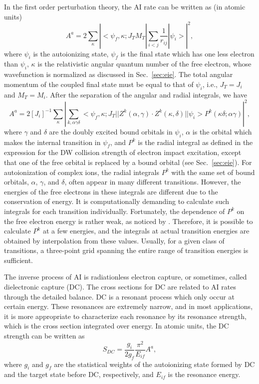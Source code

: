In the first order perturbation theory, the AI rate can be written as (in
atomic units) 
\begin{equation}
A^a = 2\sum_\kappa \left|
<\psi_f,\kappa;J_TM_T|\sum_{i<j}\frac{1}{r_{ij}}|\psi_i>\right|^2,
\end{equation}
where $\psi_i$ is the autoionizing state, $\psi_f$ is the final state which has
one less electron than $\psi_i$, $\kappa$ is the relativistic angular quantum
number of the free electron, whose wavefunction is normalized as discussed in
Sec.~\ref{sec:eie}. The total angular momentum of the coupled final state must
be equal to that of $\psi_i$, i.e.,  $J_T = J_i$ and $M_T = M_i$. After the
separation of the angular and radial integrals, we have
\begin{equation}
A^a = 2[J_i]^{-1}\sum_\kappa \left|\sum_{k,\alpha\gamma\delta}
<\psi_f,\kappa;J_T||Z^k(\alpha,\gamma)
\cdot Z^k(\kappa,\delta)||\psi_i>P^k(\kappa\delta;\alpha\gamma)\right|^2,
\end{equation}
where $\gamma$ and $\delta$ are the doubly excited bound orbitals in
$\psi_i$, $\alpha$ is the orbital which makes the internal transition in
$\psi_f$, and
$P^k$ is the radial integral as defined in the expression for the DW collision
strength of electron impact excitation, except that one of the free orbital
is replaced by a bound orbital (see Sec.~\ref{sec:eie}). For autoionization of
complex ions, the radial integrals $P^k$ with the same set of bound orbitals,
$\alpha$, $\gamma$, and $\delta$, 
often appear in many different transitions. However, the energies of the free
electrons in these integrals are different due to the conservation of
energy. It is 
computationally demanding to calculate such integrals for each transition
individually. Fortunately, the dependence of $P^k$ on the free electron energy
is rather weak, as noticed by \citet{oreg91}. Therefore, it is possible to
calculate $P^k$ at a few energies, and the integrals at actual transition
energies are obtained by interpolation from these values. Usually, for a given
class of 
transitions, a three-point grid spanning the entire range of transition
energies is sufficient.

The inverse process of AI is radiationless electron capture, or sometimes,
called dielectronic capture (DC). The cross sections for DC are related to AI
rates through the detailed balance. DC is a resonant process which only occur
at certain energy. These resonances are extremely narrow, and in most
applications, it is more appropriate to characterize each resonance by its
resonance strength, which is the cross section integrated over energy. In
atomic units, the DC strength can be written as
\begin{equation}
S_{DC} = \frac{g_i}{2g_f}\frac{\pi^2}{E_{if}}A^a,
\end{equation}
where $g_i$ and $g_f$ are the statistical weights of the autoionizing state
formed by DC and the target state before DC, respectively, and $E_{if}$ is the
resonance energy. 

